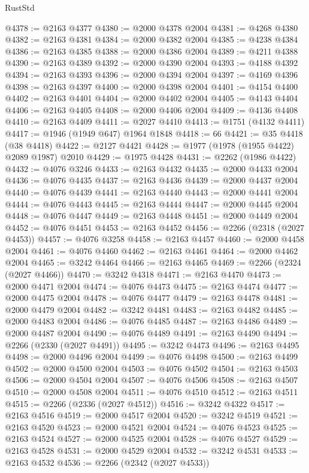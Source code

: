 \begin{lexlean}{RustStd}
\begin{coremodule}
{\begin{coremodule}
{{{{{{{{{{{{{{{{{{{{{{{{{{{{{{{@4378 := @2163 @4377
@4380 := @2000 @4378 @2004
@4381 := @4268 @4380
@4382 := @2163 @4381
@4384 := @2000 @4382 @2004
@4385 := @4238 @4384
@4386 := @2163 @4385
@4388 := @2000 @4386 @2004
@4389 := @4211 @4388
@4390 := @2163 @4389
@4392 := @2000 @4390 @2004
@4393 := @4188 @4392
@4394 := @2163 @4393
@4396 := @2000 @4394 @2004
@4397 := @4169 @4396
@4398 := @2163 @4397
@4400 := @2000 @4398 @2004
@4401 := @4154 @4400
@4402 := @2163 @4401
@4404 := @2000 @4402 @2004
@4405 := @4143 @4404
@4406 := @2163 @4405
@4408 := @2000 @4406 @2004
@4409 := @4136 @4408
@4410 := @2163 @4409
@4411 := @2027 @4410
@4413 := @1751 (@4132 @4411)
@4417 := @1946 (@1949 @647) @1964 @1848
@4418 := 66
@4421 := @35 @4418 (@38 @4418)
@4422 := @2127 @4421
@4428 := @1977 (@1978 (@1955 @4422) @2089 @1987) @2010
@4429 := @1975 @4428
@4431 := @2262 (@1986 @4422)
@4432 := @4076 @3246
@4433 := @2163 @4432
@4435 := @2000 @4433 @2004
@4436 := @4076 @4435
@4437 := @2163 @4436
@4439 := @2000 @4437 @2004
@4440 := @4076 @4439
@4441 := @2163 @4440
@4443 := @2000 @4441 @2004
@4444 := @4076 @4443
@4445 := @2163 @4444
@4447 := @2000 @4445 @2004
@4448 := @4076 @4447
@4449 := @2163 @4448
@4451 := @2000 @4449 @2004
@4452 := @4076 @4451
@4453 := @2163 @4452
@4456 := @2266 (@2318 (@2027 @4453))
@4457 := @4076 @3258
@4458 := @2163 @4457
@4460 := @2000 @4458 @2004
@4461 := @4076 @4460
@4462 := @2163 @4461
@4464 := @2000 @4462 @2004
@4465 := @3242 @4464
@4466 := @2163 @4465
@4469 := @2266 (@2324 (@2027 @4466))
@4470 := @3242 @4318
@4471 := @2163 @4470
@4473 := @2000 @4471 @2004
@4474 := @4076 @4473
@4475 := @2163 @4474
@4477 := @2000 @4475 @2004
@4478 := @4076 @4477
@4479 := @2163 @4478
@4481 := @2000 @4479 @2004
@4482 := @3242 @4481
@4483 := @2163 @4482
@4485 := @2000 @4483 @2004
@4486 := @4076 @4485
@4487 := @2163 @4486
@4489 := @2000 @4487 @2004
@4490 := @4076 @4489
@4491 := @2163 @4490
@4494 := @2266 (@2330 (@2027 @4491))
@4495 := @3242 @4473
@4496 := @2163 @4495
@4498 := @2000 @4496 @2004
@4499 := @4076 @4498
@4500 := @2163 @4499
@4502 := @2000 @4500 @2004
@4503 := @4076 @4502
@4504 := @2163 @4503
@4506 := @2000 @4504 @2004
@4507 := @4076 @4506
@4508 := @2163 @4507
@4510 := @2000 @4508 @2004
@4511 := @4076 @4510
@4512 := @2163 @4511
@4515 := @2266 (@2336 (@2027 @4512))
@4516 := @3242 @4322
@4517 := @2163 @4516
@4519 := @2000 @4517 @2004
@4520 := @3242 @4519
@4521 := @2163 @4520
@4523 := @2000 @4521 @2004
@4524 := @4076 @4523
@4525 := @2163 @4524
@4527 := @2000 @4525 @2004
@4528 := @4076 @4527
@4529 := @2163 @4528
@4531 := @2000 @4529 @2004
@4532 := @3242 @4531
@4533 := @2163 @4532
@4536 := @2266 (@2342 (@2027 @4533))
}}}}}}}}}}}}}}}}}}}}}}}}}}}}}}}
\end{coremodule}}
\end{coremodule}
\end{lexlean}

